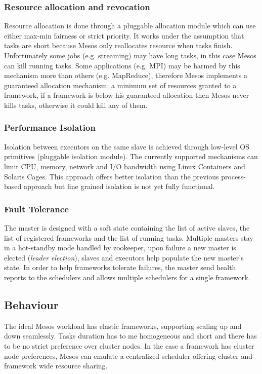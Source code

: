 		\subsubsection{Resource allocation and revocation}
		Resource allocation is done through a pluggable allocation module which can use either max-min fairness or strict priority.\newline
		It works under the assumption that tasks are short because Mesos only reallocates resource when tasks finish.\newline
		Unfortunately some jobs (e.g. streaming) may have long tasks, in this case Mesos can kill running tasks. Some applications (e.g. MPI) may be harmed by this mechanism more than others (e.g. MapReduce), therefore Mesos implements a guaranteed allocation mechanism: a minimum set of resources granted to a framework, if a framework is below his guaranteed allocation then Mesos never kills tasks, otherwise it could kill any of them.
		\subsubsection{Performance Isolation}
		Isolation between executors on the same slave is achieved through low-level OS primitives (pluggable isolation module). The currently supported mechanisms can limit CPU, memory, network and I/O bandwidth using Linux Containers and Solaris Cages.\newline
		This approach offers better isolation than the previous process-based approach but fine grained isolation is not yet fully functional.
		\subsubsection{Fault Tolerance}
		The master is designed with a soft state containing the list of active slaves, the list of registered frameworks and the list of running tasks.\newline
		Multiple masters stay in a hot-standby mode handled by zookeeper, upon failure a new master is elected (\textit{leader election}), slaves and executors help populate the new master's state.\newline
		In order to help frameworks tolerate failures, the master send health reports to the schedulers and allows multiple schedulers for a single framework.
	\subsection{Behaviour}
	The ideal Mesos workload has elastic frameworks, supporting scaling up and down seamlessly. Tasks duration has to me homogeneous and short and there has to be no strict preference over cluster nodes.\newline
	In the case a framework has cluster node preferences, Mesos can emulate a centralized scheduler offering cluster and framework wide resource sharing.
